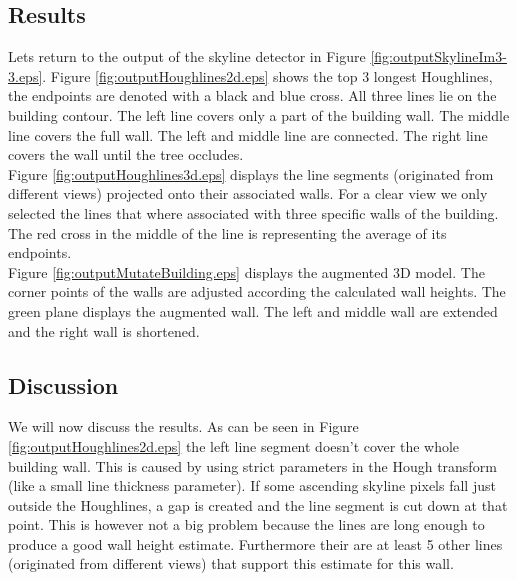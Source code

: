 \documentclass[10pt]{article}
\begin{document}
	

\subsection{Results}
\noindent
{}
Lets return to the output of the skyline detector in Figure \ref{fig:outputSkylineIm3-3.eps}.
Figure \ref{fig:outputHoughlines2d.eps} shows the top 3 longest Houghlines, the
endpoints are denoted with a black and blue cross. All three lines lie on the
building contour.  The left line covers only a part of the building wall. The
middle line covers the full wall. The left and middle line are connected. The
right line covers the wall until the tree occludes.\\

Figure \ref{fig:outputHoughlines3d.eps} displays the line segments (originated from
different views) projected onto their associated walls.  For a clear view we
only selected the lines that where associated with three specific walls of the building.  
The red cross in the middle of the line is representing the average of its endpoints.\\

Figure \ref{fig:outputMutateBuilding.eps} displays the augmented 3D model. The
corner points of the walls are adjusted according the calculated wall heights.
The green plane displays the augmented wall. The left and middle wall are extended
and the right wall is shortened.\\


\subsection{Discussion}
We will now discuss the results. As can be seen in Figure
\ref{fig:outputHoughlines2d.eps} the left line segment doesn't cover the whole
building wall. This is caused by using strict parameters in the Hough transform
(like a small line thickness parameter).  If some ascending skyline pixels fall just outside
the Houghlines, a gap is created and the line segment is cut down at that point.
This is however not a big problem because the lines are long enough to produce a
good wall height estimate. Furthermore their are at least 5 other lines
(originated from different views) that
support this estimate for this wall.\\
\end{document}
